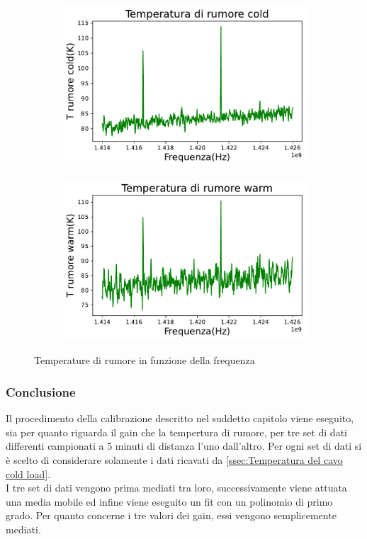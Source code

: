 \begin{figure}[H]
\centering

\begin{subfigure}[h!]{0.49\textwidth}
	\includegraphics[width=\textwidth]{Temperatura_rumore_cold.pdf}
    \label{fig:sub1}
\end{subfigure}
\hfill
\begin{subfigure}[h!]{0.49\textwidth}
    \includegraphics[width=\textwidth]{Temperatura_rumore_warm.pdf}
    \label{fig:sub2}
\end{subfigure}
\caption{Temperature di rumore in funzione della frequenza}
\end{figure}


\subsubsection{Conclusione}
Il procedimento della calibrazione descritto nel suddetto capitolo viene eseguito, sia per quanto riguarda il gain che la tempertura di rumore, per tre set di dati differenti campionati a 5 minuti di distanza l'uno dall'altro. Per ogni set di dati si è scelto di considerare solamente i dati ricavati da \eqref{ssec:Temperatura del cavo cold load}.\\
I tre set di dati vengono prima mediati tra loro, successivamente viene attuata una media mobile ed infine viene eseguito un fit con un polinomio di primo grado. Per quanto concerne i tre valori dei gain, essi vengono semplicemente mediati. 

